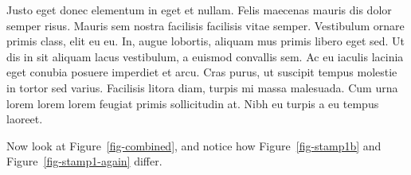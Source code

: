 \documentclass[
  9pt,
  letterpaper,
  DIV=11,
  numbers=noendperiod]{scrartcl}
\begin{document}
Justo eget donec elementum in eget et nullam. Felis maecenas mauris dis
dolor semper risus. Mauris sem nostra facilisis facilisis vitae semper.
Vestibulum ornare primis class, elit eu eu. In, augue lobortis, aliquam
mus primis libero eget sed. Ut dis in sit aliquam lacus vestibulum, a
euismod convallis sem. Ac eu iaculis lacinia eget conubia posuere
imperdiet et arcu. Cras purus, ut suscipit tempus molestie in tortor sed
varius. Facilisis litora diam, turpis mi massa malesuada. Cum urna lorem
lorem lorem feugiat primis sollicitudin at. Nibh eu turpis a eu tempus
laoreet.

Now look at Figure~\ref{fig-combined}, and notice how
Figure~\ref{fig-stamp1b} and Figure~\ref{fig-stamp1-again} differ.

\begin{figure}

\begin{minipage}[t]{0.50\linewidth}

{\centering 


}

\end{minipage}%
%
\begin{minipage}[t]{0.50\linewidth}


\end{minipage}
\end{figure}
\end{document}
